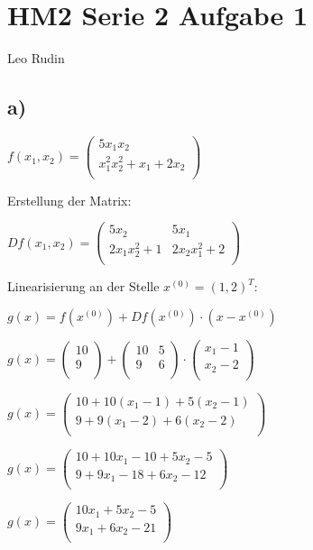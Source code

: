 \documentclass{article}
\begin{document}
\section*{HM2 Serie 2 Aufgabe 1}
Leo Rudin

\subsection*{a)}

\(f(x_1,x_2) = 
\begin{pmatrix}
5x_1x_2 \\
x_1^2x_2^2+x_1+2x_2 \\
\end{pmatrix}
\)

Erstellung der Matrix:

\(
Df(x_1,x_2) = 
\begin{pmatrix}
5x_2 & 5x_1 \\
2x_1x_2^2+1 & 2x_2x_1^2 + 2 \\
\end{pmatrix}
\)

Linearisierung an der Stelle \(x^{(0)} = (1,2)^T\):

\(g(x) = f(x^{(0)}) + Df(x^{(0)}) \cdot (x-x^{(0)})\)

\(
g(x) =
\begin{pmatrix}
10\\
9\\
\end{pmatrix}
+
\begin{pmatrix}
10 & 5 \\
9 & 6 \\
\end{pmatrix}
\cdot
\begin{pmatrix}
x_1 - 1 \\
x_2 - 2 \\
\end{pmatrix}
\)

\(
g(x) =
\begin{pmatrix}
10 + 10(x_1 - 1) + 5(x_2 - 1) \\
9 + 9(x_1 - 2) + 6(x_2 - 2) \\
\end{pmatrix}
\)

\(
g(x) =
\begin{pmatrix}
10 + 10x_1 - 10 + 5x_2 - 5\\
9 + 9x_1 - 18 + 6x_2 - 12\\
\end{pmatrix}
\)

\(
g(x) =
\begin{pmatrix}
10x_1 + 5x_2 - 5\\
9x_1 + 6x_2 - 21\\
\end{pmatrix}
\)
\end{document}
